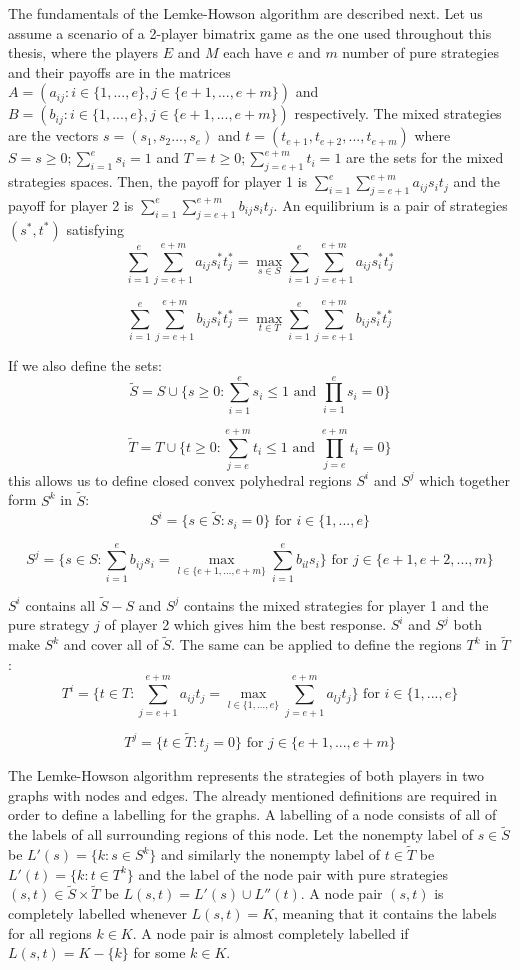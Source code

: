 The fundamentals of the Lemke-Howson algorithm are described next. Let us assume a scenario of a 2-player bimatrix game as the one used throughout this thesis, where the players $E$ and $M$ each have $e$ and $m$ number of pure strategies and their payoffs are in the matrices $A = (a_{ij}: i \in \{1,...,e\}, j \in \{ e+1,...,e+m\})$ and $B = (b_{ij}: i \in \{1,...,e\}, j \in \{e+1,...,e+m\})$ respectively. The mixed strategies are the vectors $s=(s_1,s_2...,s_e)$ and $t=(t_{e+1},t_{e+2},...,t_{e+m})$ where $S = {s \geq 0; \sum_{i=1}^{e}s_i = 1}$ and $T = {t \geq 0; \sum_{j=e+1}^{e+m}t_i = 1}$ are the sets for the mixed strategies spaces. Then, the payoff for player 1 is $\sum_{i=1}^{e}\sum_{j=e+1}^{e+m} a_{ij} s_i t_j$ and the payoff for player 2 is $\sum_{i=1}^{e} \sum_{j=e+1}^{e+m} b_{ij} s_i t_j$. An equilibrium is a pair of strategies $(s^*,t^*)$ satisfying
\[
\sum_{i=1}^{e} \sum_{j=e+1}^{e+m} a_{ij}s_i^*t_j^* = \max_{s \in S} \sum_{i=1}^{e} \sum_{j=e+1}^{e+m} a_{ij}s_i^* t_j^*
\]

\[
\sum_{i=1}^{e} \sum_{j=e+1}^{e+m} b_{ij}s_i^*t_j^* = \max_{t \in T} \sum_{i=1}^{e} \sum_{j=e+1}^{e+m} b_{ij}s_i^* t_j^*
\]

If we also define the sets:
\[
\tilde{S} =  S \cup \{ s \geq 0: \sum_{i=1}^{e} s_i \leq 1 \text{ and } \prod_{i=1}^{e} s_i = 0 \}
\]

\[
\tilde{T} = T \cup \{t \geq 0: \sum_{j=e}^{e+m} t_i \leq 1 \text{ and } \prod_{j=e}^{e+m} t_i = 0 \}
\]
this allows us to define closed convex polyhedral regions $S^i$ and $S^j$ which together form $S^k$ in $\tilde{S}$:
\[
S^i = \{ s \in \tilde{S}: s_i = 0 \} \text{ for } i \in \{1,...,e\}
\]

\[
S^j = \{ s \in S: \sum_{i=1}^{e} b_{ij} s_i = \max_{l \in \{e+1,...,e+m\}} \sum_{i=1}^{e} b_{il} s_i \} \text{ for } j \in \{e+1,e+2,...,m\}
\]

$S^i$ contains all $\tilde{S}-S$ and $S^j$ contains the mixed strategies for player 1 and the pure strategy $j$ of player 2 which gives him the best response. $S^i$ and $S^j$ both make $S^k$ and cover all of $\tilde{S}$. The same can be applied to define the regions $T^k$ in $\tilde{T}$:
\[ 
T^i = \{ t \in T: \sum_{j=e+1}^{e+m} a_{ij} t_j = \max_{l \in \{1,...,e\}} \sum_{j=e+1}^{e+m} a_{lj} t_j \} \text{ for } i \in \{1,...,e\} 
\]

\[
T^j = \{ t \in \tilde{T}: t_j = 0 \} \text{ for } j \in \{e+1,...,e+m\} 
\]

The Lemke-Howson algorithm represents the strategies of both players in two graphs with nodes and edges. The already mentioned definitions are required in order to define a labelling for the graphs. A labelling of a node consists of all of the labels of all surrounding regions of this node. Let the nonempty label of $s \in \tilde{S}$ be $L'(s) = \{ k: s \in S^k \}$ and similarly the nonempty label of $t \in \tilde{T}$ be $L'(t) = \{ k: t \in T^k \}$ and the label of the node pair with pure strategies $(s,t) \in \tilde{S} \times \tilde{T}$ be $L(s,t) = L'(s) \cup L''(t)$. A node pair $(s,t)$ is completely labelled whenever $L(s,t) = K$, meaning that it contains the labels for all regions $k \in K$. A node pair is almost completely labelled if $L(s,t) = K - \{k\}$ for some $k \in K$. 

